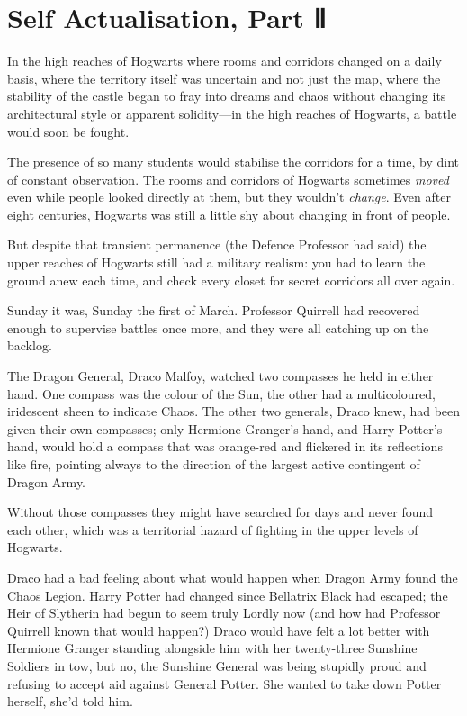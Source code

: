 \chapter{Self Actualisation, Part Ⅱ}\label{self-actualisation-part}

In the high reaches of Hogwarts where rooms and corridors changed on a
daily basis, where the territory itself was uncertain and not just the
map, where the stability of the castle began to fray into dreams and
chaos without changing its architectural style or apparent solidity---in
the high reaches of Hogwarts, a battle would soon be fought.

The presence of so many students would stabilise the corridors for a
time, by dint of constant observation. The rooms and corridors of
Hogwarts sometimes \emph{moved} even while people looked directly at
them, but they wouldn't \emph{change}. Even after eight centuries,
Hogwarts was still a little shy about changing in front of people.

But despite that transient permanence (the Defence Professor had said)
the upper reaches of Hogwarts still had a military realism: you had to
learn the ground anew each time, and check every closet for secret
corridors all over again.

Sunday it was, Sunday the first of March. Professor Quirrell had
recovered enough to supervise battles once more, and they were all
catching up on the backlog.

The Dragon General, Draco Malfoy, watched two compasses he held in
either hand. One compass was the colour of the Sun, the other had a
multicoloured, iridescent sheen to indicate Chaos. The other two
generals, Draco knew, had been given their own compasses; only Hermione
Granger's hand, and Harry Potter's hand, would hold a compass that was
orange-red and flickered in its reflections like fire, pointing always
to the direction of the largest active contingent of Dragon Army.

Without those compasses they might have searched for days and never
found each other, which was a territorial hazard of fighting in the
upper levels of Hogwarts.

Draco had a bad feeling about what would happen when Dragon Army found
the Chaos Legion. Harry Potter had changed since Bellatrix Black had
escaped; the Heir of Slytherin had begun to seem truly Lordly now (and
how had Professor Quirrell known that would happen?) Draco would have
felt a lot better with Hermione Granger standing alongside him with her
twenty-three Sunshine Soldiers in tow, but no, the Sunshine General was
being stupidly proud and refusing to accept aid against General Potter.
She wanted to take down Potter herself, she'd told him.

